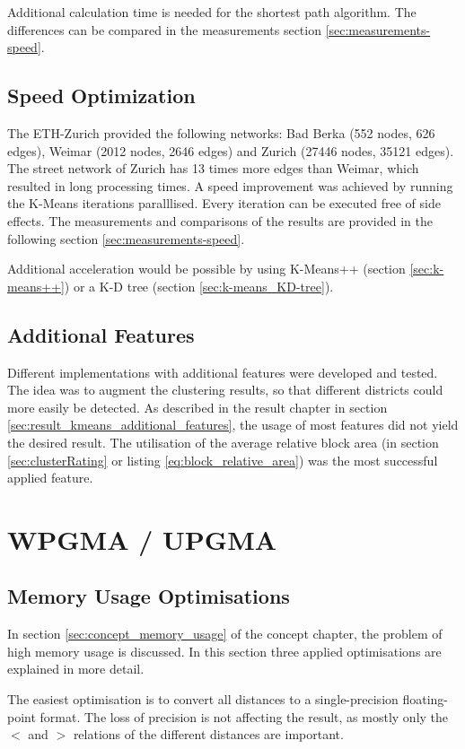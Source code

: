 Additional calculation time is needed for the shortest path algorithm. The differences can be compared in the measurements section \ref{sec:measurements-speed}.

\subsection{Speed Optimization}
The ETH-Zurich provided the following networks: Bad Berka (552 nodes, 626 edges), Weimar (2012 nodes, 2646 edges) and Zurich (27446 nodes, 35121 edges). The street network of Zurich has 13 times more edges than Weimar, which resulted in long processing times. A speed improvement was achieved by running the K-Means iterations paralllised. Every iteration can be executed free of side effects. The measurements and comparisons of the results are provided in the following section \ref{sec:measurements-speed}.

Additional acceleration would be possible by using K-Means++ (section \ref{sec:k-means++}) or a K-D tree (section \ref{sec:k-means_KD-tree}).

\subsection{Additional Features}
Different implementations with additional features were developed and tested. The idea was to augment the clustering results, so that different districts could more easily be detected. As described in the result chapter in section \ref{sec:result_kmeans_additional_features}, the usage of most features did not yield the desired result. The utilisation of the average relative block area (in section \ref{sec:clusterRating} or listing \ref{eq:block_relative_area}) was the most successful applied feature.

\pagebreak
\section{WPGMA / UPGMA}
\subsection{Memory Usage Optimisations} \label{sec:memory_usage}
In section \ref{sec:concept_memory_usage} of the concept chapter, the problem of high memory usage is discussed. In this section three applied optimisations are explained in more detail.

The easiest optimisation is to convert all distances to a single-precision floating-point format. The loss of precision is not affecting the result, as mostly only the $<$ and $>$ relations of the different distances are important.

